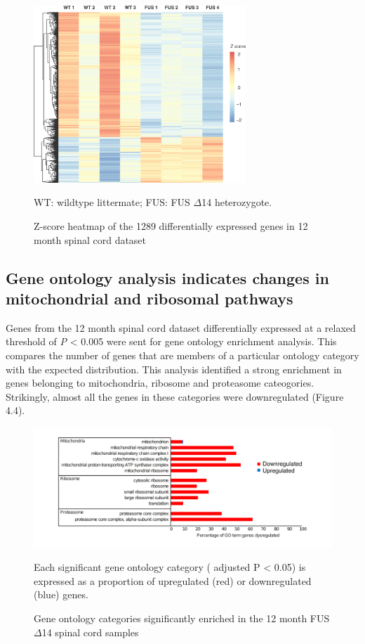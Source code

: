 \begin{figure}[h!]
	\begin{center}
		\includegraphics[width=8cm]{Figures/04_fus_mice/anny_normalised_heatmap.png}
	\end{center}
	\caption{Z-score heatmap of the 1289 differentially expressed genes in 12 month spinal cord dataset}
	WT: wildtype littermate; FUS: FUS $\Delta$14 heterozygote. 
\end{figure}


\subsection{Gene ontology analysis indicates changes in mitochondrial and ribosomal pathways}
Genes from the 12 month spinal cord dataset differentially expressed at a relaxed threshold of \textit{P} < 0.005 were sent for gene ontology enrichment analysis. This compares the number of genes that are members of a particular ontology category with the expected distribution. This analysis identified a strong enrichment in genes belonging to mitochondria, ribosome and proteasome cateogories. Strikingly, almost all the genes in these categories were downregulated (Figure 4.4).
\begin{figure}[h!]
	\begin{center}
		\includegraphics[width=12cm]{Figures/04_fus_mice/anny_GO_terms.png}
	\end{center}
	\caption{Gene ontology categories significantly enriched in the 12 month FUS $\Delta$14 spinal cord samples  }
		Each significant gene ontology category ( adjusted P < 0.05) is expressed as a proportion of upregulated (red) or downregulated (blue) genes.
\end{figure}


